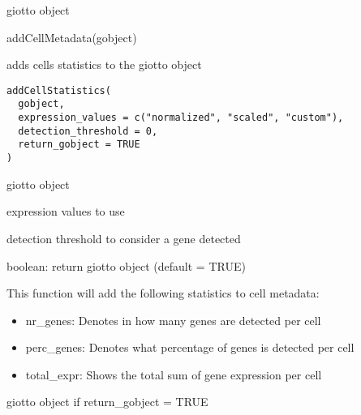 \documentclass[a4paper]{book}
\begin{document}
%
\begin{Value}
giotto object
\end{Value}
%
\begin{Examples}
\begin{ExampleCode}
    addCellMetadata(gobject)
\end{ExampleCode}
\end{Examples}
%
\begin{Description}\relax
adds cells statistics to the giotto object
\end{Description}
%
\begin{Usage}
\begin{verbatim}
addCellStatistics(
  gobject,
  expression_values = c("normalized", "scaled", "custom"),
  detection_threshold = 0,
  return_gobject = TRUE
)
\end{verbatim}
\end{Usage}
%
\begin{Arguments}
\begin{ldescription}
\item[\code{gobject}] giotto object

\item[\code{expression\_values}] expression values to use

\item[\code{detection\_threshold}] detection threshold to consider a gene detected

\item[\code{return\_gobject}] boolean: return giotto object (default = TRUE)
\end{ldescription}
\end{Arguments}
%
\begin{Details}\relax
This function will add the following statistics to cell metadata:
\begin{itemize}

\item{} nr\_genes: Denotes in how many genes are detected per cell
\item{} perc\_genes: Denotes what percentage of genes is detected per cell
\item{} total\_expr: Shows the total sum of gene expression per cell

\end{itemize}

\end{Details}
%
\begin{Value}
giotto object if return\_gobject = TRUE
\end{Value}
\end{document}
